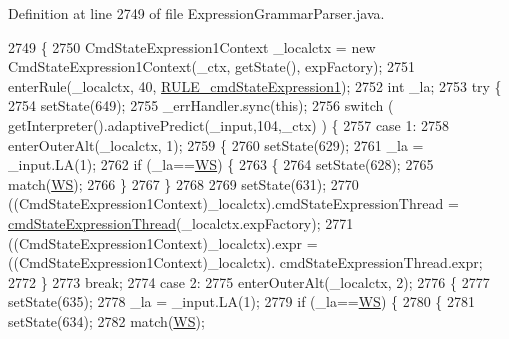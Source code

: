 Definition at line 2749 of file Expression\+Grammar\+Parser.\+java.


\begin{DoxyCode}
2749                                                                                                            
                   \{
2750     CmdStateExpression1Context \_localctx = \textcolor{keyword}{new} CmdStateExpression1Context(\_ctx, getState(), expFactory);
2751     enterRule(\_localctx, 40, \hyperlink{classgov_1_1nasa_1_1jpf_1_1inspector_1_1server_1_1expression_1_1parser_1_1_expression_grammar_parser_a0ab8b5ce09497a01d54b3aaec758e731}{RULE\_cmdStateExpression1});
2752     \textcolor{keywordtype}{int} \_la;
2753     \textcolor{keywordflow}{try} \{
2754       setState(649);
2755       \_errHandler.sync(\textcolor{keyword}{this});
2756       \textcolor{keywordflow}{switch} ( getInterpreter().adaptivePredict(\_input,104,\_ctx) ) \{
2757       \textcolor{keywordflow}{case} 1:
2758         enterOuterAlt(\_localctx, 1);
2759         \{
2760         setState(629);
2761         \_la = \_input.LA(1);
2762         \textcolor{keywordflow}{if} (\_la==\hyperlink{classgov_1_1nasa_1_1jpf_1_1inspector_1_1server_1_1expression_1_1parser_1_1_expression_grammar_parser_ace44714ae633c7b14794cc5a24d9ebf3}{WS}) \{
2763           \{
2764           setState(628);
2765           match(\hyperlink{classgov_1_1nasa_1_1jpf_1_1inspector_1_1server_1_1expression_1_1parser_1_1_expression_grammar_parser_ace44714ae633c7b14794cc5a24d9ebf3}{WS});
2766           \}
2767         \}
2768 
2769         setState(631);
2770         ((CmdStateExpression1Context)\_localctx).cmdStateExpressionThread = 
      \hyperlink{classgov_1_1nasa_1_1jpf_1_1inspector_1_1server_1_1expression_1_1parser_1_1_expression_grammar_parser_aa1d5db45ac1bf7eceb29571e40f51853}{cmdStateExpressionThread}(\_localctx.expFactory);
2771          ((CmdStateExpression1Context)\_localctx).expr =  ((CmdStateExpression1Context)\_localctx).
      cmdStateExpressionThread.expr; 
2772         \}
2773         \textcolor{keywordflow}{break};
2774       \textcolor{keywordflow}{case} 2:
2775         enterOuterAlt(\_localctx, 2);
2776         \{
2777         setState(635);
2778         \_la = \_input.LA(1);
2779         \textcolor{keywordflow}{if} (\_la==\hyperlink{classgov_1_1nasa_1_1jpf_1_1inspector_1_1server_1_1expression_1_1parser_1_1_expression_grammar_parser_ace44714ae633c7b14794cc5a24d9ebf3}{WS}) \{
2780           \{
2781           setState(634);
2782           match(\hyperlink{classgov_1_1nasa_1_1jpf_1_1inspector_1_1server_1_1expression_1_1parser_1_1_expression_grammar_parser_ace44714ae633c7b14794cc5a24d9ebf3}{WS});

\end{DoxyCode}
